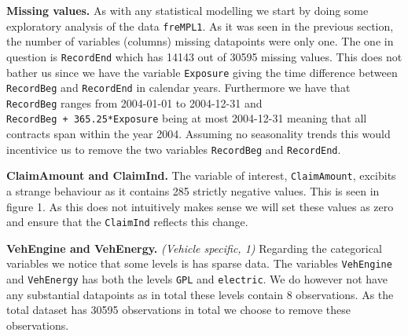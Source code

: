 \documentclass[
]{article}
\begin{document}
\textbf{Missing values.} As with any statistical modelling we start by
doing some exploratory analysis of the data \texttt{freMPL1}. As it was
seen in the previous section, the number of variables (columns) missing
datapoints were only one. The one in question is \texttt{RecordEnd}
which has 14143 out of 30595 missing values. This does not bather us
since we have the variable \texttt{Exposure} giving the time difference
between \texttt{RecordBeg} and \texttt{RecordEnd} in calendar years.
Furthermore we have that \texttt{RecordBeg} ranges from 2004-01-01 to
2004-12-31 and \texttt{RecordBeg\ +\ 365.25*Exposure} being at most
2004-12-31 meaning that all contracts span within the year 2004.
Assuming no seasonality trends this would incentivice us to remove the
two variables \texttt{RecordBeg} and \texttt{RecordEnd}.

\textbf{ClaimAmount and ClaimInd.} The variable of interest,
\texttt{ClaimAmount}, excibits a strange behaviour as it contains 285
strictly negative values. This is seen in figure 1. As this does not
intuitively makes sense we will set these values as zero and ensure that
the \texttt{ClaimInd} reflects this change.

\textbf{VehEngine and VehEnergy.} \emph{(Vehicle specific, 1)} Regarding
the categorical variables we notice that some levels is has sparse data.
The variables \texttt{VehEngine} and \texttt{VehEnergy} has both the
levels \texttt{GPL} and \texttt{electric}. We do however not have any
substantial datapoints as in total these levels contain 8 observations.
As the total dataset has 30595 observations in total we choose to remove
these observations.
\end{document}
